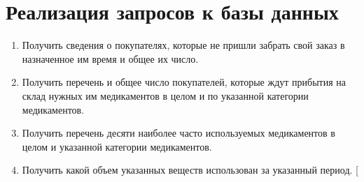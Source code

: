 \documentclass[a4paper]{article}
\begin{document}
	\section{Реализация запросов к базы данных}
		\begin{enumerate}			
			\item Получить сведения о покупателях, которые не пришли забрать свой заказ в назначенное им время и общее их число.
				
			\item Получить перечень и общее число покупателей, которые ждут прибытия на склад нужных им медикаментов в целом и по указанной категории медикаментов.
				
				
				
				
			\item Получить перечень десяти наиболее часто используемых медикаментов в целом и указанной категории медикаментов.
				
				
			\item  Получить какой объем указанных веществ использован за указанный период.
				[

\end{enumerate}
\end{document}
